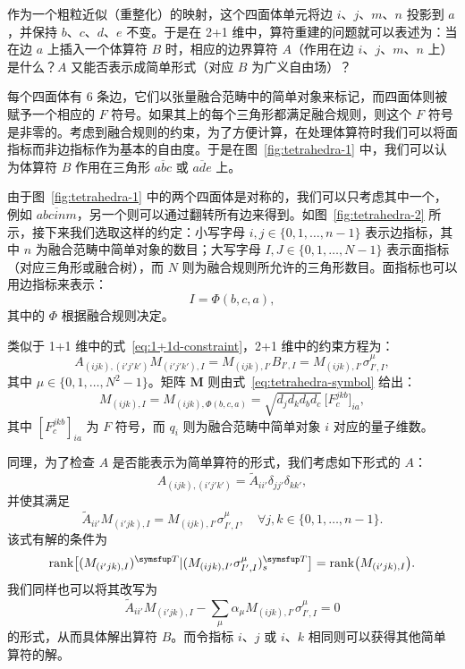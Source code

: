 作为一个粗粒近似（重整化）的映射，这个四面体单元将边 $i$、$j$、$m$、$n$ 投影到 $a$，并保持 $b$、$c$、$d$、$e$ 不变。于是在 2+1 维中，算符重建的问题就可以表述为：当在边 $a$ 上插入一个体算符 $B$ 时，相应的边界算符 $A$（作用在边 $i$、$j$、$m$、$n$ 上）是什么？$A$ 又能否表示成简单形式（对应 $B$ 为广义自由场）？

每个四面体有 6 条边，它们以张量融合范畴中的简单对象来标记，而四面体则被赋予一个相应的 $F$ 符号。如果其上的每个三角形都满足融合规则，则这个 $F$ 符号是非零的。考虑到融合规则的约束，为了方便计算，在处理体算符时我们可以将面指标而非边指标作为基本的自由度。于是在图~\ref{fig:tetrahedra-1} 中，我们可以认为体算符 $B$ 作用在三角形 $\overline{abc}$ 或 $\overline{ade}$ 上。

由于图~\ref{fig:tetrahedra-1} 中的两个四面体是对称的，我们可以只考虑其中一个，例如 $\overline{abcinm}$，另一个则可以通过翻转所有边来得到。如图~\ref{fig:tetrahedra-2} 所示，接下来我们选取这样的约定：小写字母 $i,j\in\{0,1,\dots,n-1\}$ 表示边指标，其中 $n$ 为融合范畴中简单对象的数目；大写字母 $I, J\in \{0,1,\dots,N-1\}$ 表示面指标（对应三角形或融合树），而 $N$ 则为融合规则所允许的三角形数目。面指标也可以用边指标来表示：
\begin{equation}
  I = \Phi(b,c,a),
\end{equation}
其中的 $\Phi$ 根据融合规则决定。

类似于 1+1 维中的式~\eqref{eq:1+1d-constraint}，2+1 维中的约束方程为：
\begin{equation}
    A_{(ijk), (i'j'k')} M_{(i'j'k'), I}
  = M_{(ijk), I'} B_{I', I}
  = M_{(ijk), I'} \sigma^\mu_{I', I},
\end{equation}
其中 $\mu\in\{0,1,\dots,N^2-1\}$。矩阵 $\bm{M}$ 则由式~\eqref{eq:tetrahedra-symbol} 给出：
\begin{equation}
  M_{(ijk), I} = M_{(ijk), \Phi(b,c,a)} = \sqrt{d_j d_k d_b d_c} \, \bigl[ F^{jkb}_c \bigr]_{ia},
\end{equation}
其中 $[F^{jkb}_c]_{ia}$ 为 $F$ 符号，而 $q_i$ 则为融合范畴中简单对象 $i$ 对应的量子维数。

同理，为了检查 $A$ 是否能表示为简单算符的形式，我们考虑如下形式的 $A$：
\begin{equation}
  A_{(ijk), (i'j'k')} = \tilde{A}_{ii'} \delta_{jj'} \delta_{kk'},
\end{equation}
并使其满足
\begin{equation}
  \tilde{A}_{ii'} M_{(i'jk), I} = M_{(ijk), I'} \sigma^\mu_{I', I}, \quad
  \forall j, k \in \{ 0, 1, \dots, n-1 \}.
\end{equation}
该式有解的条件为
\begin{equation}
  \rank\bigl[(M_{(i'jk), I})^\trans | (M_{(ijk), I'} \sigma^\mu_{I', I})^\trans_s \bigr] = \rank\bigl( M_{(i'jk), I} \bigr).
\end{equation}
我们同样也可以将其改写为
\begin{equation}
  \tilde{A}_{ii'} M_{(i'jk), I} - \sum_\mu \alpha_\mu M_{(ijk), I'} \sigma^\mu_{I', I} = 0
  \label{eq:2+1d-simple-form-augmented-constraint}
\end{equation}
的形式，从而具体解出算符 $B$。而令指标 $i$、$j$ 或 $i$、$k$ 相同则可以获得其他简单算符的解。

